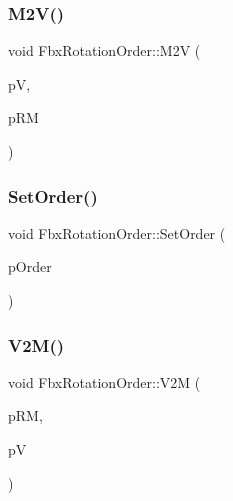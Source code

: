 \subsubsection{\texorpdfstring{M2\+V()}{M2V()}}
{\footnotesize\ttfamily void Fbx\+Rotation\+Order\+::\+M2V (\begin{DoxyParamCaption}\item[{\hyperlink{class_fbx_vector4}{Fbx\+Vector4} \&}]{pV,  }\item[{const \hyperlink{class_fbx_a_matrix}{Fbx\+A\+Matrix} \&}]{p\+RM }\end{DoxyParamCaption})}

\mbox{\label{class_fbx_rotation_order_ac6269a975333f6cdc9d34630d0afed79}} 
\subsubsection{\texorpdfstring{Set\+Order()}{SetOrder()}}
{\footnotesize\ttfamily void Fbx\+Rotation\+Order\+::\+Set\+Order (\begin{DoxyParamCaption}\item[{\hyperlink{class_fbx_euler_a7d5bec7eedb022b4dae56894ab7a9939}{Fbx\+Euler\+::\+E\+Order}}]{p\+Order }\end{DoxyParamCaption})}

\mbox{\label{class_fbx_rotation_order_a51aaffe701607ad3ce75f153f8ff1965}} 
\subsubsection{\texorpdfstring{V2\+M()}{V2M()}}
{\footnotesize\ttfamily void Fbx\+Rotation\+Order\+::\+V2M (\begin{DoxyParamCaption}\item[{\hyperlink{class_fbx_a_matrix}{Fbx\+A\+Matrix} \&}]{p\+RM,  }\item[{const \hyperlink{class_fbx_vector4}{Fbx\+Vector4} \&}]{pV }\end{DoxyParamCaption})}

\mbox{\label{class_fbx_rotation_order_ae06483cd7b2d959fd38c55135879a2cf}} 
